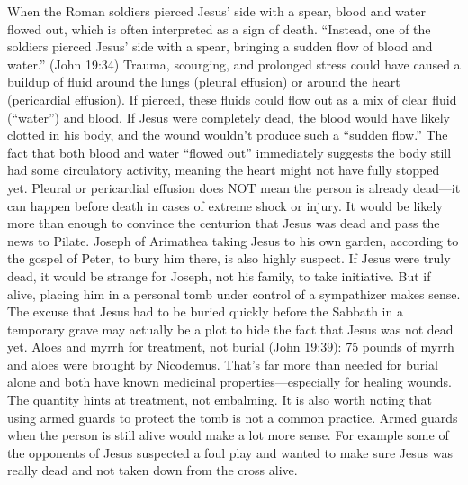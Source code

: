 When the Roman soldiers pierced Jesus' side with a spear, blood and water flowed out, which is often interpreted as a sign of death.
``Instead, one of the soldiers pierced Jesus' side with a spear, bringing a sudden flow of blood and water.'' (John 19:34) Trauma, scourging, and prolonged stress could have caused a buildup of fluid around the lungs (pleural effusion) or around the heart (pericardial effusion).
If pierced, these fluids could flow out as a mix of clear fluid (``water'') and blood.
If Jesus were completely dead, the blood would have likely clotted in his body, and the wound wouldn't produce such a ``sudden flow.'' The fact that both blood and water ``flowed out'' immediately suggests the body still had some circulatory activity, meaning the heart might not have fully stopped yet.
Pleural or pericardial effusion does NOT mean the person is already dead---it can happen before death in cases of extreme shock or injury.
It would be likely more than enough to convince the centurion that Jesus was dead and pass the news to Pilate.
Joseph of Arimathea taking Jesus to his own garden, according to the gospel of Peter, to bury him there, is also highly suspect.
If Jesus were truly dead, it would be strange for Joseph, not his family, to take initiative.
But if alive, placing him in a personal tomb under control of a sympathizer makes sense.
The excuse that Jesus had to be buried quickly before the Sabbath in a temporary grave may actually be a plot to hide the fact that Jesus was not dead yet.
Aloes and myrrh for treatment, not burial (John 19:39): 75 pounds of myrrh and aloes were brought by Nicodemus.
That's far more than needed for burial alone and both have known medicinal properties---especially for healing wounds.
The quantity hints at treatment, not embalming.
It is also worth noting that using armed guards to protect the tomb is not a common practice.
Armed guards when the person is still alive would make a lot more sense.
For example some of the opponents of Jesus suspected a foul play and wanted to make sure Jesus was really dead and not taken down from the cross alive.

